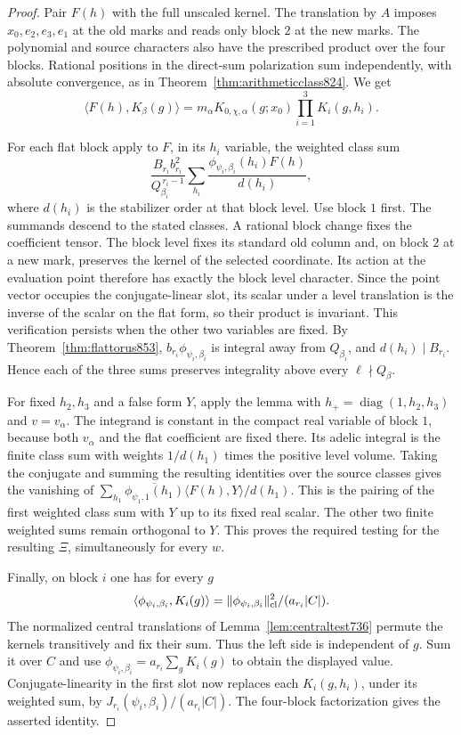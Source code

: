 \documentclass[a4paper,11pt]{article}
\theoremstyle{definition}
\theoremstyle{remark}
\numberwithin{equation}{section}
\begin{document}
\begin{proof}
Pair \(F(h)\) with the full unscaled kernel. The translation
by \(A\) imposes \(x_0,e_2,e_3,e_1\) at the old marks and reads
only block \(2\) at the new marks. The polynomial and source
characters also have the prescribed product over the four
blocks. Rational positions in the direct-sum polarization
sum independently, with absolute convergence, as in
Theorem~\ref{thm:arithmeticclass824}. We get
\[
   \langle F(h),K_\beta(g)\rangle
    =m_\alpha K_{0,\chi,\alpha}(g;x_0)
                         \prod_{i=1}^3 K_i(g,h_i).
\]

For each flat block apply to \(F\), in its \(h_i\) variable,
the weighted class sum
\[
       \frac{B_{r_i}b_{r_i}^2}{Q_{\beta_i}^{\,r_i-1}}
         \sum_{h_i}\frac{\phi_{\psi_i,\beta_i}(h_i)
                                      F(h)}{d(h_i)} ,
\]
where \(d(h_i)\) is the stabilizer order at that block level.
Use block \(1\) first. The summands descend to the stated
classes. A rational block change fixes the coefficient tensor.
The block level fixes its standard old column and, on block
\(2\) at a new mark, preserves the kernel of the selected
coordinate. Its action at the evaluation point therefore has
exactly the block level character. Since the point vector
occupies the conjugate-linear slot, its scalar under a level
translation is the inverse of the scalar on the flat form,
so their product is invariant. This verification persists
when the other two variables are fixed. By
Theorem~\ref{thm:flattorus853}, \(b_{r_i}\phi_{\psi_i,\beta_i}\)
is integral away from \(Q_{\beta_i}\), and \(d(h_i)\mid B_{r_i}\).
Hence each of the three sums preserves integrality above every
\(\ell\nmid Q_\beta\).

For fixed \(h_2,h_3\) and a false form \(Y\), apply the lemma
with \(h_+=\operatorname{diag}(1,h_2,h_3)\) and \(v=v_\alpha\).
The integrand is constant in the compact real variable of
block \(1\), because both \(v_\alpha\) and the flat coefficient
are fixed there. Its adelic integral is the finite class sum
with weights \(1/d(h_1)\) times the positive level volume.
Taking the conjugate and summing the resulting identities over
the source classes gives the vanishing of
\(\sum_{h_1}\overline{\phi_{\psi_1,1}(h_1)}
 \langle F(h),Y\rangle/d(h_1)\).
This is the pairing of the first weighted class sum with \(Y\)
up to its fixed real scalar. The other two finite weighted
sums remain orthogonal to \(Y\). This proves the required
testing for the resulting \(\Xi\), simultaneously for every
\(w\).

Finally, on block \(i\) one has for every \(g\)
\[
     \langle\phi_{\psi_i,\beta_i},K_i(g)\rangle
         =\|\phi_{\psi_i,\beta_i}\|_{\rm cl}^2/(a_{r_i}|C|).
\]
The normalized central translations of
Lemma~\ref{lem:centraltest736} permute the kernels transitively
and fix their sum. Thus the left side is independent of \(g\).
Sum it over \(C\) and use
\(\phi_{\psi_i,\beta_i}=a_{r_i}\sum_gK_i(g)\) to obtain the
displayed value. Conjugate-linearity in the first slot now
replaces each \(K_i(g,h_i)\), under its weighted sum, by
\(J_{r_i}(\psi_i,\beta_i)/(a_{r_i}|C|)\). The four-block
factorization gives the asserted identity.
\end{proof}
\clearpage
\end{document}
